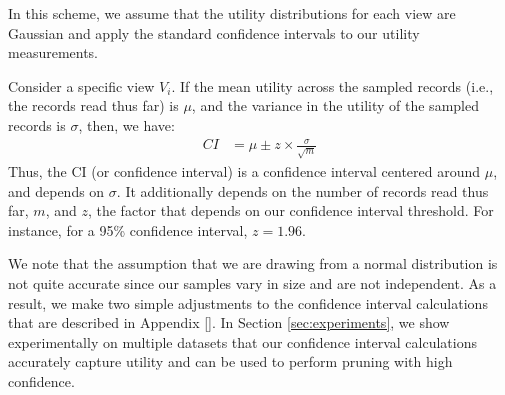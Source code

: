  In this scheme, we assume that the utility
distributions for each view are Gaussian and apply the standard confidence
intervals to our utility measurements.

Consider a specific view $V_i$. 
If the mean utility across the sampled records 
(i.e., the records read thus far) is $\mu$,
and the variance in the utility of the sampled records
is $\sigma$, then, we have:
\begin{align}
CI & = \mu \pm z \times \frac{\sigma}{\sqrt{m}}
\end{align}
Thus, the CI (or confidence interval) is 
a confidence interval centered around $\mu$, 
and depends on $\sigma$. 
It additionally depends on the number of records
read thus far, $m$,
and $z$, the factor that depends on our confidence interval threshold.
For instance, for a 95\% confidence interval, $z = 1.96$.

We note that the assumption that we are drawing from a normal distribution is
not quite accurate since our samples vary in size and are not independent.
As a result, we make two simple adjustments to the confidence interval
calculations that are described in Appendix \ref{}.
In Section \ref{sec:experiments}, we show experimentally on multiple datasets
that our confidence interval calculations accurately capture utility and can be used to
perform pruning with high confidence.







